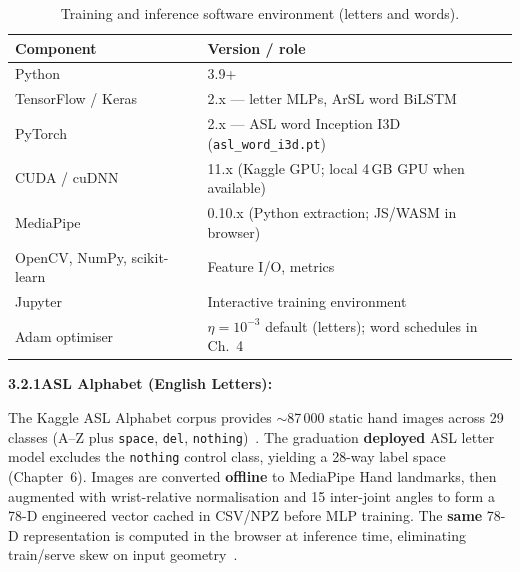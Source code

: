 \begin{table}[H]
\centering
\caption{Training and inference software environment (letters and words).}
\label{tab:ch3-env}
\small
\begin{tabular}{|l|l|}
\hline
\textbf{Component} & \textbf{Version / role} \\
\hline
Python & 3.9+ \\
TensorFlow / Keras~\cite{abadi2016tensorflow,chollet2015keras} & 2.x --- letter MLPs, ArSL word BiLSTM \\
PyTorch~\cite{pytorch2024} & 2.x --- ASL word Inception I3D (\texttt{asl\_word\_i3d.pt}) \\
CUDA / cuDNN~\cite{chetlur2014cudnn} & 11.x (Kaggle GPU; local 4\,GB GPU when available) \\
MediaPipe~\cite{zhang2020mediapipe,mediapipeweb} & 0.10.x (Python extraction; JS/WASM in browser) \\
OpenCV, NumPy, scikit-learn~\cite{opencv2024docs,harris2020numpy,pedregosa2011sklearn} & Feature I/O, metrics \\
Jupyter~\cite{kluyver2016jupyter} & Interactive training environment \\
Adam optimiser~\cite{kingma2015adam} & $\eta{=}10^{-3}$ default (letters); word schedules in Ch.~4 \\
\hline
\end{tabular}
\end{table}
\vspace{0.3cm}
\clearpage
\noindent\textbf{3.2.1\quad ASL Alphabet (English Letters):}\par
{}
\vspace{0.3cm}
\noindent The Kaggle ASL Alphabet corpus provides $\sim$87\,000 static hand images across 29 classes (A--Z plus \texttt{space}, \texttt{del}, \texttt{nothing})~\cite{akash2019aslalphabet}. The graduation \textbf{deployed} ASL letter model excludes the \texttt{nothing} control class, yielding a 28-way label space (Chapter~6). Images are converted \textbf{offline} to MediaPipe Hand landmarks, then augmented with wrist-relative normalisation and 15 inter-joint angles to form a 78-D engineered vector cached in CSV/NPZ before MLP training. The \textbf{same} 78-D representation is computed in the browser at inference time, eliminating train/serve skew on input geometry~\cite{zhang2020mediapipe}.\par\vspace{0.4cm}

